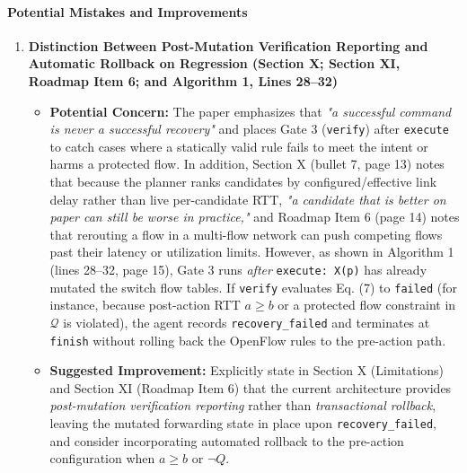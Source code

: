 \documentclass[11pt,a4paper]{article}
\begin{document}
\paragraph{Potential Mistakes and Improvements}
\begin{enumerate}[leftmargin=1.6em,itemsep=3pt]
\item \textbf{Distinction Between Post-Mutation Verification Reporting and Automatic Rollback on Regression (Section X; Section XI, Roadmap Item 6; and Algorithm 1, Lines 28–32)}
\begin{itemize}[leftmargin=1.8em,itemsep=2pt]
\item \textbf{Potential Concern:} The paper emphasizes that \emph{"a successful command is never a successful recovery"} and places Gate 3 (\texttt{verify}) after \texttt{execute} to catch cases where a statically valid rule fails to meet the intent or harms a protected flow. In addition, Section X (bullet 7, page 13) notes that because the planner ranks candidates by configured/effective link delay rather than live per-candidate RTT, \emph{"a candidate that is better on paper can still be worse in practice,"} and Roadmap Item 6 (page 14) notes that rerouting a flow in a multi-flow network can push competing flows past their latency or utilization limits. However, as shown in Algorithm 1 (lines 28–32, page 15), Gate 3 runs \emph{after} \texttt{execute: X(p)} has already mutated the switch flow tables. If \texttt{verify} evaluates Eq. (7) to \texttt{failed} (for instance, because post-action RTT $a \ge b$ or a protected flow constraint in $\mathcal{Q}$ is violated), the agent records \texttt{recovery\_failed} and terminates at \texttt{finish} without rolling back the OpenFlow rules to the pre-action path.
\item \textbf{Suggested Improvement:} Explicitly state in Section X (Limitations) and Section XI (Roadmap Item 6) that the current architecture provides \emph{post-mutation verification reporting} rather than \emph{transactional rollback}, leaving the mutated forwarding state in place upon \texttt{recovery\_failed}, and consider incorporating automated rollback to the pre-action configuration when $a \ge b$ or $\neg Q$.
\end{itemize}
\end{enumerate}
\end{document}

